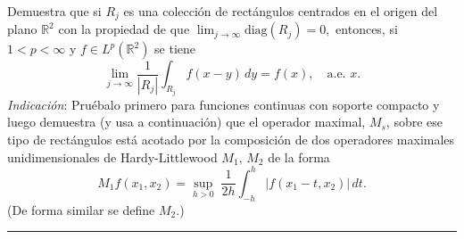 \documentclass[11pt,a4paper]{article}
\begin{document}
    Demuestra que si $R_j$ es una colección de rectángulos centrados en el origen del plano $\mathbb R^2$ con la propiedad de que $\displaystyle \lim_{j\to\infty} \mbox{diag}(R_j)= 0,$ entonces, si $1<p<\infty$ y $f\in L^p(\mathbb R^2)$ se tiene
 $$
 \lim_{j\to\infty}\frac 1{|R_j|}\int_{R_j} f(x-y)\, dy = f(x), \quad \mbox{a.e. }  x.
 $$
 {\it Indicación}: Pruébalo primero para funciones continuas con soporte compacto y luego demuestra (y usa a continuación) que el operador maximal, $M_s$, sobre ese tipo de rectángulos está acotado por la composición de dos operadores maximales unidimensionales de Hardy-Littlewood $M_1, \, M_2$ de la forma
 $$
 M_1f(x_1,x_2)=\sup_{h>0}\; \frac1{2h}\int_{-h}^{h}|f(x_1-t,x_2)|\, dt.
 $$
 (De forma similar se define $M_2$.)
   
\vskip 6mm
\hrule
\vskip 5mm

 
 
\end{document}
